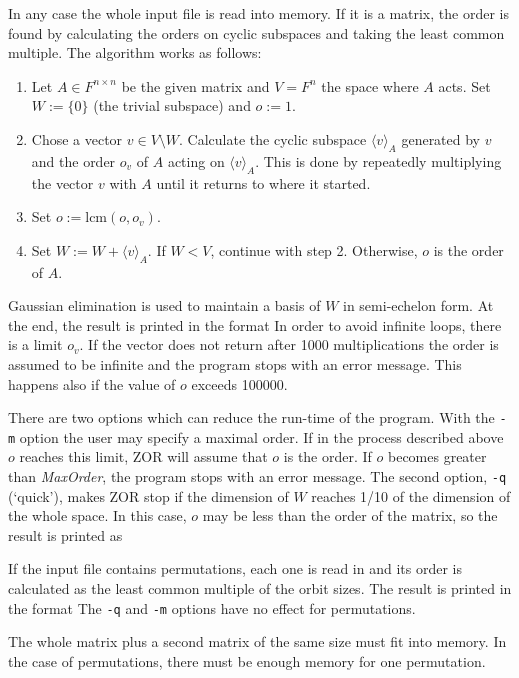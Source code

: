 \Implementation
In any case the whole input file is read into memory. If it is a matrix,
the order is found by calculating the orders on cyclic subspaces
and taking the least common multiple. The algorithm works as follows:
\begin{enumerate}
\item Let $A\in F^{n\times n}$ be the given matrix and $V=F^n$ the
      space where $A$ acts. Set $W:=\{0\}$ (the trivial subspace)
      and $o:=1$.
\item Chose a vector $v\in V\setminus W$. Calculate the cyclic subspace
      $\langle v\rangle_A$ generated by $v$ and the order $o_v$ of $A$
      acting on $\langle v\rangle_A$.
      This is done by repeatedly multiplying the vector $v$ with $A$
      until it returns to where it started.
\item Set $o:=\mbox{lcm}(o,o_v)$.
\item Set $W:=W+\langle v\rangle_A$. If $W<V$, continue with
      step 2. Otherwise, $o$ is the order of $A$.
\end{enumerate}
Gaussian elimination is used to maintain a basis of $W$ in
semi-echelon form. 
At the end, the result is printed in the format
In order to avoid infinite loops, there is a limit $o_v$. If the vector
does not return after 1000 multiplications the order is assumed to be
infinite and the program stops with an error message. This happens also
if the value of $o$ exceeds 100000.

There are two options which can reduce the run-time of the program.
With the {\tt -m} option the user may specify a maximal order. If in
the process described above $o$ reaches this limit, ZOR will assume
that $o$ is the order. If $o$ becomes greater than {\it MaxOrder},
the program stops with an error message.
The second option, {\tt -q} (`quick'), makes ZOR stop if the dimension
of $W$ reaches 1/10 of the dimension of the whole space. In this
case, $o$ may be less than the order of the matrix, so the result
is printed as



If the input file contains permutations, each one is read in and
its order is calculated as the least common multiple of the orbit
sizes. The result is printed in the format
The {\tt -q} and {\tt -m} options have no effect for permutations.


\Limits
The whole matrix plus a second matrix of the same size must fit into
memory. In the case of permutations, there must be enough memory for
one permutation.



